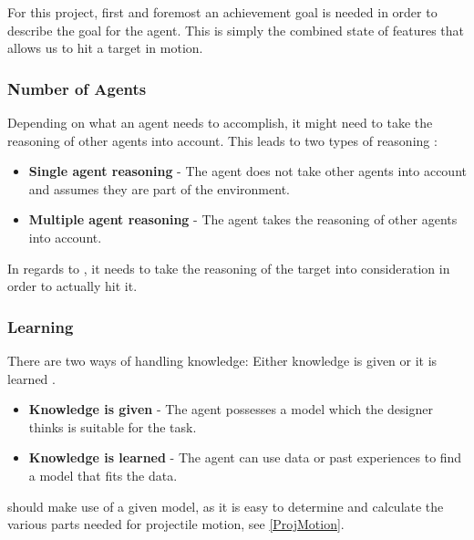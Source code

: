 For this project, first and foremost an achievement goal is needed in order to
describe the goal for the agent. This is simply the combined state of features
that allows us to hit a target in motion. 

\subsubsection{Number of Agents}
Depending on what an agent needs to accomplish, it might need to take the
reasoning of other agents into account. This leads to two types of reasoning
\citep[Ch. 1.5.6]{MIBook}:
\begin{itemize}
  \item \textbf{Single agent reasoning} - The agent does not take other
  agents into account and assumes they are part of the environment.
  \item \textbf{Multiple agent reasoning} - The agent takes the reasoning of
  other agents into account.
\end{itemize}

In regards to \namep, it needs to take the reasoning of the target into
consideration in order to actually hit it.


\subsubsection{Learning}

There are two ways of handling knowledge: Either knowledge is given or
it is learned \citep[Ch. 1.5.7]{MIBook}. 
\begin{itemize}
  \item \textbf{Knowledge is given} - The agent possesses a model which the
designer thinks is suitable for the task.
  \item \textbf{Knowledge is learned} - The agent can use data or past
  experiences to find a model that fits the data.
\end{itemize}

\name should make use of a given model, as it is easy to determine and
calculate the various parts needed for projectile motion, see
\autoref{ProjMotion}.


